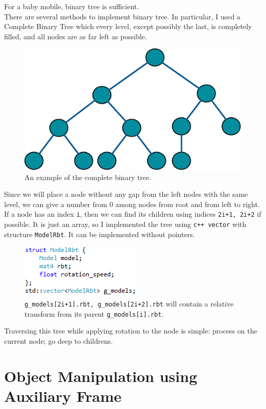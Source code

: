 \documentclass[11pt]{article}
\begin{document}
For a baby mobile, binary tree is sufficient. \\
There are several methods to implement binary tree. In particular, I used a Complete Binary Tree which every level, except possibly the last, is completely filled, and all nodes are as far left as possible.
\newpage
\begin{figure}[htb]
	\begin{center}
		\includegraphics[width=0.5\linewidth]{CompleteBinary.eps}
	\end{center}
	\caption{An example of the complete binary tree.}
\end{figure}
Since we will place a node without any gap from the left nodes with the same level, we can give a number from 0 among nodes from root and from left to right. If a node has an index \texttt{i}, then we can find its children using indices \texttt{2i+1, 2i+2} if possible. It is just an array, so I implemented the tree using \texttt{c++ vector} with structure \texttt{ModelRbt}. It can be implemented without pointers.
\begin{figure}[htb]
	\begin{center}
		\includegraphics[width=0.4\linewidth]{gModel.png}
	\end{center}
	\caption{\texttt{g\_models[2i+1].rbt, g\_models[2i+2].rbt} will contain a relative transform from its parent \texttt{g\_models[i].rbt}.}
\end{figure}

Traversing this tree while applying rotation to the node is simple: process on the current node; go deep to childrens.

\section{Object Manipulation using Auxiliary Frame} \label{sec:4}
\end{document}
